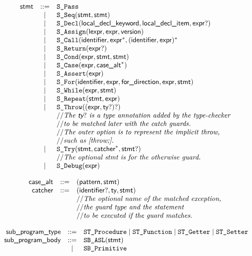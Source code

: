 \documentclass{book}
\begin{document}
\[
\begin{array}{rcl}
\textsf{stmt} &::=& \texttt{S\_Pass}\\
  &|& \texttt{S\_Seq}(\textsf{stmt}, \textsf{stmt})\\
  &|& \texttt{S\_Decl}(\textsf{local\_decl\_keyword}, \textsf{local\_decl\_item}, \textsf{expr}?)\\
  &|& \texttt{S\_Assign}(\textsf{lexpr}, \textsf{expr}, \textsf{version})\\
  &|& \texttt{S\_Call}(\textsf{identifier}, \textsf{expr}^*, (\textsf{identifier}, \textsf{expr})^*\\
  &|& \texttt{S\_Return}(\textsf{expr}?)\\
  &|& \texttt{S\_Cond}(\textsf{expr}, \textsf{stmt}, \textsf{stmt})\\
  &|& \texttt{S\_Case}(\textsf{expr}, \textsf{case\_alt}^*)\\
  &|& \texttt{S\_Assert}(\textsf{expr})\\
  &|& \texttt{S\_For}(\textsf{identifier}, \textsf{expr}, \textsf{for\_direction}, \textsf{expr}, \textsf{stmt})\\
  &|& \texttt{S\_While}(\textsf{expr}, \textsf{stmt})\\
  &|& \texttt{S\_Repeat}(\textsf{stmt}, \textsf{expr})\\
  &|& \texttt{S\_Throw}((\textsf{expr}, \textsf{ty}?)?)\\
  & & // \textit{The $\textsf{ty}?$ is a type annotation added by the type-checker}\ \\
  & & // \textit{to be matched later with the catch guards.}\ \\
  & & // \textit{The outer option is to represent the implicit throw,}\ \\
  & & // \textit{such as [throw;].}\ \\
  &|& \texttt{S\_Try}(\textsf{stmt}, \textsf{catcher}^*, \textsf{stmt}?)\\
  & & // \textit{The optional stmt is for the otherwise guard.}\ \\
  &|& \texttt{S\_Debug}(\textsf{expr})
\end{array}
\]

\[
\begin{array}{rcl}
\textsf{case\_alt} &::=& (\textsf{pattern}, \textsf{stmt})\\
\textsf{catcher} &::=& (\textsf{identifier}?, \textsf{ty}, \textsf{stmt})\\
  & & // \textit{The optional name of the matched exception,}\ \\
  & & // \textit{the guard type and the statement}\ \\
  & & // \textit{to be executed if the guard matches.}\ \\
\end{array}
\]

\[
\begin{array}{rcl}
\textsf{sub\_program\_type} &::=& \texttt{ST\_Procedure} \;|\; \texttt{ST\_Function} \;|\; \texttt{ST\_Getter} \;|\; \texttt{ST\_Setter}\\
\textsf{sub\_program\_body} &::=& \texttt{SB\_ASL}(\textsf{stmt})\\
  &|& \texttt{SB\_Primitive}\\
\end{array}
\]
\end{document}
